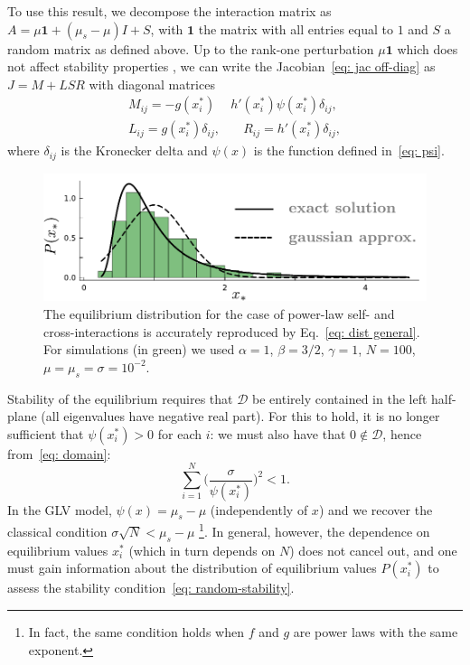 \documentclass[
 prl,
 twocolumn,
 amsmath,
 amssymb,
 aps,
]{revtex4-2}
\begin{document}
To use this result, we decompose the interaction matrix as $A = \mu\mathbf{1} + (\mu_s-\mu)I + S$,
with $\mathbf{1}$ the matrix with all entries equal to $1$ and $S$ a random matrix as defined above.
Up to the rank-one perturbation $\mu\mathbf{1}$ which does not affect stability properties \cite{Stone2018}, we can write the Jacobian~\eqref{eq: jac off-diag} as $J = M + LSR$ with diagonal matrices
\begin{align}
    M_{ij} = - g(x_i^*)&h'(x_i^*)\psi(x_i^*)\delta_{ij}, \nonumber \\ 
    L_{ij} = g(x_i^*)\delta_{ij}, & \quad R_{ij} = h'(x_i^*)\delta_{ij}, 
\end{align}
where $\delta_{ij}$ is the Kronecker delta and $\psi(x)$ is the function defined in~\eqref{eq: psi}.
\begin{figure}[t!]
    \includegraphics[width=.45\textwidth]{cavity.pdf}
    \caption{The equilibrium distribution for the case of power-law self- and cross-interactions is accurately reproduced by Eq.~\eqref{eq: dist general}.
    For simulations (in green) we used $\alpha=1$, $\beta=3/2$,
    $\gamma=1$, $N=100$, $\mu=\mu_s=\sigma=10^{-2}$.}
    \label{fig: cavity sol.}
\end{figure}
Stability of the equilibrium requires that $\mathcal{D}$ be entirely contained in the left half-plane (all eigenvalues have negative real part). For this to hold, it is no longer sufficient that $\psi(x_i^*) > 0$ for each $i$: we must also have that $0\notin \mathcal{D}$, hence from~\eqref{eq: domain}:
\begin{equation}
    \sum_{i=1}^N \Big(\frac{\sigma}{\psi(x_i^*)}\Big)^{2}
    < 1.
    \label{eq: random-stability}
\end{equation}
In the GLV model, $\psi(x) = \mu_s - \mu$ (independently of $x$) and we recover the classical condition $\sigma\sqrt{N} < \mu_s - \mu$ \footnote{In fact, the same condition holds when $f$ and $g$ are power laws with the same exponent.}. In general, however, the dependence on equilibrium values $x_i^*$ (which in turn depends on $N$) does not cancel out, and one must gain information about the distribution of equilibrium values $P(x_i^*)$ to assess the stability condition~\eqref{eq: random-stability}.

\end{document}
